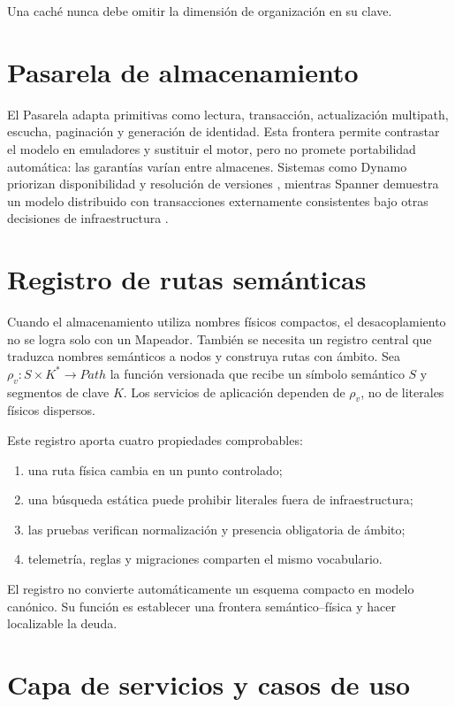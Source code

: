 Una caché nunca debe omitir la dimensión de organización en su clave.

\section{Pasarela de almacenamiento}

El Pasarela adapta primitivas como lectura, transacción, actualización multipath,
escucha, paginación y generación de identidad. Esta frontera permite contrastar el
modelo en emuladores y sustituir el motor, pero no promete portabilidad automática: las
garantías varían entre almacenes. Sistemas como Dynamo priorizan disponibilidad y
resolución de versiones \parencite{decandia2007dynamo}, mientras Spanner demuestra un
modelo distribuido con transacciones externamente consistentes bajo otras decisiones de
infraestructura \parencite{corbett2012spanner}.

\section{Registro de rutas semánticas}

Cuando el almacenamiento utiliza nombres físicos compactos, el desacoplamiento no se
logra solo con un Mapeador. También se necesita un registro central que traduzca nombres
semánticos a nodos y construya rutas con ámbito. Sea
\(\rho_v:S\times K^*\rightarrow Path\) la función versionada que recibe un símbolo
semántico \(S\) y segmentos de clave \(K\). Los servicios de aplicación dependen de
\(\rho_v\), no de literales físicos dispersos.

Este registro aporta cuatro propiedades comprobables:

\begin{enumerate}[leftmargin=*]
  \item una ruta física cambia en un punto controlado;
  \item una búsqueda estática puede prohibir literales fuera de infraestructura;
  \item las pruebas verifican normalización y presencia obligatoria de ámbito;
  \item telemetría, reglas y migraciones comparten el mismo vocabulario.
\end{enumerate}

El registro no convierte automáticamente un esquema compacto en modelo canónico. Su
función es establecer una frontera semántico--física y hacer localizable la deuda.

\section{Capa de servicios y casos de uso}

